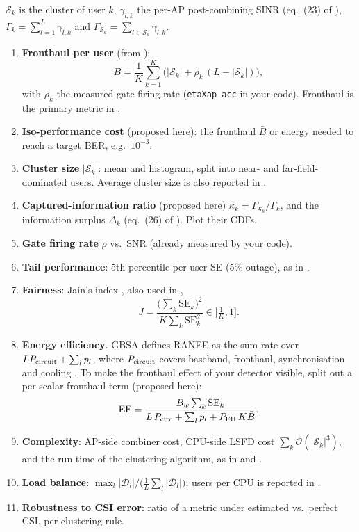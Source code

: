 \documentclass[11pt]{article}
\begin{document}
$\mathcal S_k$ is the cluster of user $k$, $\gamma_{l,k}$ the per-AP post-combining SINR (eq.~(23) of \cite{haider2026vtc}), $\Gamma_k=\sum_{l=1}^L\gamma_{l,k}$ and $\Gamma_{\mathcal S_k}=\sum_{l\in\mathcal S_k}\gamma_{l,k}$.

\begin{enumerate}[label=\textbf{M\arabic*.}]
  \item \textbf{Fronthaul per user} (from \cite[Sec.~III-B]{haider2026vtc}):
  \begin{equation}
    \bar B=\frac1K\sum_{k=1}^K\big(|\mathcal S_k|+\rho_k\,(L-|\mathcal S_k|)\big),
  \end{equation}
  with $\rho_k$ the measured gate firing rate (\texttt{etaXap\_acc} in your code). Fronthaul is the primary metric in \cite{lai2024hybridua}.
  \item \textbf{Iso-performance cost} (proposed here): the fronthaul $\bar B$ or energy needed to reach a target BER, e.g.\ $10^{-3}$.
  \item \textbf{Cluster size} $|\mathcal S_k|$: mean and histogram, split into near- and far-field-dominated users. Average cluster size is also reported in \cite[Fig.~3]{tesolin2026gbsa}.
  \item \textbf{Captured-information ratio} (proposed here) $\kappa_k=\Gamma_{\mathcal S_k}/\Gamma_k$, and the information surplus $\Delta_k$ (eq.~(26) of \cite{haider2026vtc}). Plot their CDFs.
  \item \textbf{Gate firing rate} $\rho$ vs.\ SNR (already measured by your code).
  \item \textbf{Tail performance}: 5th-percentile per-user SE (5\% outage), as in \cite{lai2024hybridua}.
  \item \textbf{Fairness}: Jain's index \cite{jain1984fairness}, also used in \cite{lai2024hybridua},
  \begin{equation}
    J=\frac{\big(\sum_k \mathrm{SE}_k\big)^2}{K\sum_k \mathrm{SE}_k^2}\in\Big[\tfrac1K,1\Big].
  \end{equation}
  \item \textbf{Energy efficiency}. GBSA defines RANEE as the sum rate over $L P_{\rm circuit}+\sum_l p_l$, where $P_{\rm circuit}$ covers baseband, fronthaul, synchronisation and cooling \cite[eq.~(5)]{tesolin2026gbsa}. To make the fronthaul effect of your detector visible, split out a per-scalar fronthaul term (proposed here):
  \begin{equation}
    \mathrm{EE}=\frac{B_w\sum_k \mathrm{SE}_k}{L\,P_{\rm circ}+\sum_l p_l+P_{\rm FH}\,K\bar B}.
  \end{equation}
  \item \textbf{Complexity}: AP-side combiner cost, CPU-side LSFD cost $\sum_k\mathcal O(|\mathcal S_k|^3)$, and the run time of the clustering algorithm, as in \cite[Fig.~1]{tesolin2026gbse} and \cite[Fig.~3]{tesolin2026gbsa}.
  \item \textbf{Load balance}: $\max_l|\mathcal D_l|/\big(\tfrac1L\sum_l|\mathcal D_l|\big)$; users per CPU is reported in \cite[Sec.~IV]{lai2024hybridua}.
  \item \textbf{Robustness to CSI error}: ratio of a metric under estimated vs.\ perfect CSI, per clustering rule.
\end{enumerate}
\end{document}
